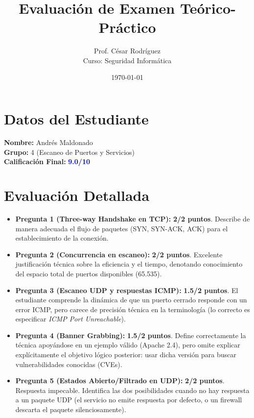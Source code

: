 \documentclass[12pt,a4paper]{article}
\title{Evaluación de Examen Teórico-Práctico}
\author{Prof. César Rodríguez \\ \small Curso: Seguridad Informática}
\date{\today}
\begin{document}
\maketitle

\section*{Datos del Estudiante}
\textbf{Nombre:} Andrés Maldonado \\
\textbf{Grupo:} 4 (Escaneo de Puertos y Servicios) \\
\textbf{Calificación Final:} \textbf{\textcolor{blue}{9.0/10}}

\section*{Evaluación Detallada}

\begin{itemize}[label=$\bullet$]
    \item \textbf{Pregunta 1 (Three-way Handshake en TCP):} \textbf{2/2 puntos}. Describe de manera adecuada el flujo de paquetes (SYN, SYN-ACK, ACK) para el establecimiento de la conexión.
    
    \item \textbf{Pregunta 2 (Concurrencia en escaneo):} \textbf{2/2 puntos}. Excelente justificación técnica sobre la eficiencia y el tiempo, denotando conocimiento del espacio total de puertos disponibles (65.535).
    
    \item \textbf{Pregunta 3 (Escaneo UDP y respuestas ICMP):} \textbf{1.5/2 puntos}. El estudiante comprende la dinámica de que un puerto cerrado responde con un error ICMP, pero carece de precisión técnica en la terminología (lo correcto es especificar \textit{ICMP Port Unreachable}).
    
    \item \textbf{Pregunta 4 (Banner Grabbing):} \textbf{1.5/2 puntos}. Define correctamente la técnica apoyándose en un ejemplo válido (Apache 2.4), pero omite explicar explícitamente el objetivo lógico posterior: usar dicha versión para buscar vulnerabilidades conocidas (CVEs).
    
    \item \textbf{Pregunta 5 (Estados Abierto/Filtrado en UDP):} \textbf{2/2 puntos}. Respuesta impecable. Identifica las dos posibilidades cuando no hay respuesta a un paquete UDP (el servicio no emite respuesta por defecto, o un firewall descarta el paquete silenciosamente).
\end{itemize}
\end{document}
